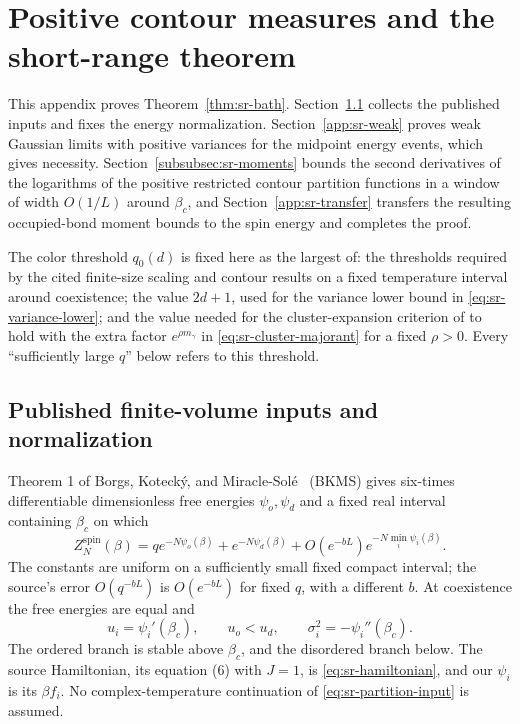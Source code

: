 \section{Positive contour measures and the short-range theorem}
\label{app:short-range-proof}

This appendix proves Theorem~\ref{thm:sr-bath}.
Section~\ref{app:sr-inputs} collects the published inputs and fixes
the energy normalization. Section~\ref{app:sr-weak} proves weak
Gaussian limits with positive variances for the midpoint energy events,
which gives necessity. Section~\ref{subsubsec:sr-moments} bounds the
second derivatives of the logarithms of the positive restricted contour
partition functions in a window of width $O(1/L)$ around $\beta_c$, and
Section~\ref{app:sr-transfer} transfers the resulting occupied-bond
moment bounds to the spin energy and completes the proof.

The color threshold $q_0(d)$ is fixed here as the largest of:
the thresholds required by the cited finite-size scaling and contour
results \cite{BorgsKoteckyMiracleSole1991,BorgsChayesTetali2012} on
a fixed temperature interval around coexistence; the value $2d+1$,
used for the variance lower bound in
\eqref{eq:sr-variance-lower}; and the value needed for the
cluster-expansion criterion of \cite{BorgsChayesTetali2012} to hold
with the extra factor $e^{\rho m_\gamma}$ in
\eqref{eq:sr-cluster-majorant} for a fixed $\rho>0$. Every
``sufficiently large $q$'' below refers to this threshold.

\subsection{Published finite-volume inputs and normalization}
\label{app:sr-inputs}

Theorem 1 of Borgs, Koteck\'y, and
Miracle-Sol\'e~\cite{BorgsKoteckyMiracleSole1991} (BKMS) gives
six-times differentiable dimensionless free energies $\psi_o,\psi_d$
and a fixed real interval containing $\beta_c$ on which
\begin{equation}
 Z_N^{\mathrm{spin}}(\beta)
 =q e^{-N\psi_o(\beta)}+e^{-N\psi_d(\beta)}
   +O(e^{-bL})e^{-N\min_i\psi_i(\beta)}.
 \label{eq:sr-partition-input}
\end{equation}
The constants are uniform on a sufficiently small fixed compact
interval; the source's error $O(q^{-bL})$ is $O(e^{-bL})$ for fixed $q$,
with a different $b$. At coexistence the free energies are equal and
\begin{equation}
 u_i=\psi_i'(\beta_c),\qquad
 u_o<u_d,\qquad \sigma_i^2=-\psi_i''(\beta_c).
 \label{eq:sr-phase-parameters}
\end{equation}
The ordered branch is stable above $\beta_c$, and the disordered branch
below. The source Hamiltonian, its equation (6) with $J=1$, is
\eqref{eq:sr-hamiltonian}, and our $\psi_i$ is its $\beta f_i$. No
complex-temperature continuation of \eqref{eq:sr-partition-input} is
assumed.

